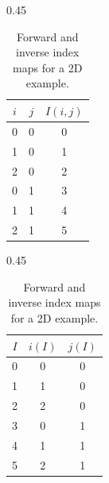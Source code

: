 \begin{table}[ht!]
    \centering
    \begin{subtable}{0.45\textwidth}
        \centering
    \begin{tabular}{c c | c}
        \toprule $i$ & $j$ & $I(i,j)$ \\ \midrule
        0 & 0 & 0 \\
        1 & 0 & 1 \\
        2 & 0 & 2 \\
        0 & 1 & 3 \\
        1 & 1 & 4 \\
        2 & 1 & 5 \\ \bottomrule
    \end{tabular}
    \caption{Forward map}
    \end{subtable}
    \begin{subtable}{0.45\textwidth}
        \centering
    \begin{tabular}{c | c c}
        \toprule $I$ & $i(I)$ & $j(I)$ \\ \midrule
        0 & 0 & 0 \\
        1 & 1 & 0 \\
        2 & 2 & 0 \\
        3 & 0 & 1 \\
        4 & 1 & 1 \\
        5 & 2 & 1 \\ \bottomrule
    \end{tabular}
    \caption{Backward map}
    \end{subtable}
    \caption{Forward and inverse index maps for a 2D example.}
\end{table}

